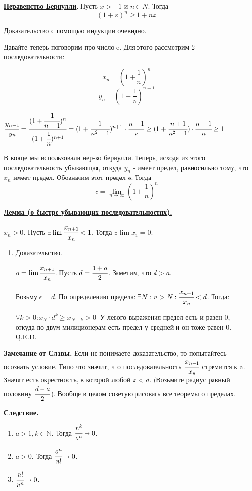 \documentclass{article}
\newcommand{\deff}[1]{\underline{\textbf{#1}}}
\newcommand{\thmm}[1]{\underline{\textbf{#1}}}
\begin{document}
\deff{Неравенство Бернулли}. Пусть $x>-1$ и $n \in N$. Тогда
\[(1+x)^n\geq 1+nx\]

Доказательство с помощью индукции очевидно.

Давайте теперь поговорим про число e. Для этого рассмотрим 2 последовательности:

\[x_n=(1+\frac{1}{n})^n\]\[ y_n=(1+\frac{1}{n})^{n+1}\]

 $\displaystyle \cfrac{y_{n-1}}{y_n} = \cfrac{(1+\cfrac{1}{n-1})^{n}}{(1+\cfrac{1}{n})^{n+1}}=(1+\cfrac{1}{n^2-1})^{n+1}\cdot\cfrac{n-1}{n}\geq (1+\cfrac{n+1}{n^2-1})\cdot\cfrac{n-1}{n} \geq 1$

В конце мы использовали нер-во бернулли. Теперь, исходя из этого последовательность убывающая, откуда $y_n$ - имеет предел, равносильно тому, что $x_n$ имеет предел. Обозначим этот предел e. Тогда
\[e=\lim_{n\to\infty}(1+\frac{1}{n})^n\]

\thmm{Лемма (о быстро убывающих последовательностях).}

$x_n>0$. Пусть $\exists \lim \cfrac{x_{n+1}}{x_n}<1$. Тогда $\exists \lim x_n =0$.
\begin{enumerate}
        \item[] \uline{Доказательство.}
        
        $a=\lim \cfrac{x_{n+1}}{x_n}$. Пусть $d=\cfrac{1+a}{2}$.  Заметим, что $d>a$.

        
        Возьму $\epsilon = d$. По определению предела: $\exists N: n>N: \cfrac{x_{n+1}}{x_n}<d$. Тогда:

        $\forall k>0:x_N\cdot d^k\geq x_{N+k}>0$. У левого выражения предел есть и равен 0, откуда по двум милиционерам есть предел у средней и он тоже равен 0. Q.E.D.

    \end{enumerate}
    
\textbf{Замечание от Славы.} Если не понимаете доказательство, то попытайтесь осознать условие. Типо что значит, что последовательность $\cfrac{x_{n+1}}{x_n}$ стремится к a. Значит есть окрестность, в которой любой $x<d$. (Возьмите радиус равный половину $\cfrac{d-a}{2}$). Вообще в целом советую рисовать все теоремы о пределах.

\textbf{Следствие.}
\begin{enumerate}
    \item $a>1, k \in \mathbb{N}$. Тогда $\cfrac{n^k}{a^n}\shortrightarrow 0$.
    \item $a>0$. Тогда $\cfrac{a^n}{n!}\shortrightarrow 0$.
    \item $\cfrac{n!}{n^n}\shortrightarrow 0$.
\end{enumerate}
\end{document}
